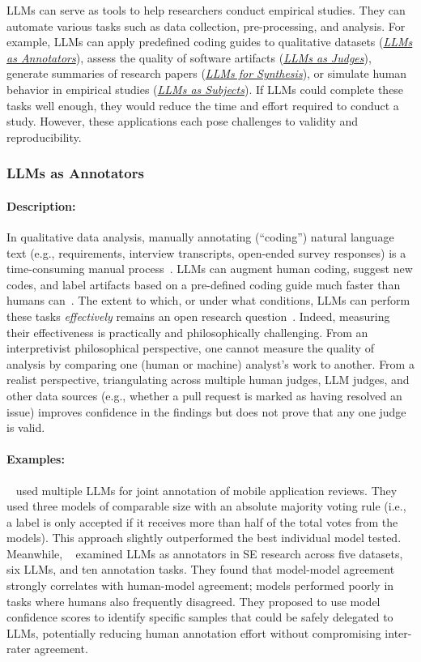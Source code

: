 \documentclass[smallextended]{svjour3}
\newcommand{\annotators}{\hyperref[sec:llms-as-annotators]{\emph{LLMs as Annotators}}\xspace}
\newcommand{\judges}{\hyperref[sec:llms-as-judges]{\emph{LLMs as Judges}}\xspace}
\newcommand{\synthesis}{\hyperref[sec:llms-for-synthesis]{\emph{LLMs for Synthesis}}\xspace}
\newcommand{\subjects}{\hyperref[sec:llms-as-subjects]{\emph{LLMs as Subjects}}\xspace}
\newcommand{\annotators}{\href{/study-types\#llms-as-annotators}{\emph{LLMs as Annotators}}\xspace}
\newcommand{\judges}{\href{/study-types\#llms-as-judges}{\emph{LLMs as Judges}}\xspace}
\newcommand{\synthesis}{\href{/study-types\#llms-for-synthesis}{\emph{LLMs for Synthesis}}\xspace}
\newcommand{\subjects}{\href{/study-types\#llms-as-subjects}{\emph{LLMs as Subjects}}\xspace}
\newcommand{\studytypesubsection}[1]{\subsubsection{#1}}
\newcommand{\studytypeparagraph}[1]{\paragraph{\bfseries #1:}}
\newcommand{\studytypesubsection}[1]{\subsection{#1}}
\newcommand{\studytypeparagraph}[1]{\subsubsection{#1}}
\begin{document}
LLMs can serve as tools to help researchers conduct empirical studies.
They can automate various tasks such as data collection, pre-processing, and analysis.
For example, LLMs can apply predefined coding guides to qualitative datasets (\annotators), assess the quality of software artifacts (\judges), generate summaries of research papers (\synthesis), or simulate human behavior in empirical studies (\subjects). If LLMs could complete these tasks well enough, they would reduce the time and effort required to conduct a study. However, these applications each pose challenges to validity and reproducibility.
 
\studytypesubsection{LLMs as Annotators}
\label{sec:llms-as-annotators}

\studytypeparagraph{Description}
In qualitative data analysis, manually annotating (``coding'') natural language text (e.g., requirements, interview transcripts, open-ended survey responses) is a time-consuming manual process~\cite{DBLP:journals/ase/BanoHZT24}. LLMs can augment human coding, suggest new codes, and label artifacts based on a pre-defined coding guide much faster than humans can~\cite{DBLP:conf/chi/HeHDRH24}. 
The extent to which, or under what conditions, LLMs can perform these tasks \textit{effectively} remains an open research question~\cite{DBLP:conf/msr/AhmedDTP25}. Indeed, measuring their effectiveness is practically and philosophically challenging. From an interpretivist philosophical perspective, one cannot measure the quality of analysis by comparing one (human or machine) analyst's work to another. From a realist perspective, triangulating across multiple human judges, LLM judges, and other data sources (e.g., whether a pull request is marked as having resolved an issue) improves confidence in the findings but does not prove that any one judge is valid.

\studytypeparagraph{Examples}
\citeauthor{Huang2023Enhancing}~\cite{Huang2023Enhancing} used multiple LLMs for joint annotation of mobile application reviews. 
They used three models of comparable size with an absolute majority voting rule (i.e., a label is only accepted if it receives more than half of the total votes from the models). This approach slightly outperformed the best individual model tested. 
Meanwhile, \citeauthor{DBLP:conf/msr/AhmedDTP25}~\cite{DBLP:conf/msr/AhmedDTP25} examined LLMs as annotators in SE research across five datasets, six LLMs, and ten annotation tasks.
They found that model-model agreement strongly correlates with human-model agreement; models performed poorly in tasks where humans also frequently disagreed. They proposed to use model confidence scores to identify specific samples that could be safely delegated to LLMs, potentially reducing human annotation effort without compromising inter-rater agreement.
 
\end{document}
